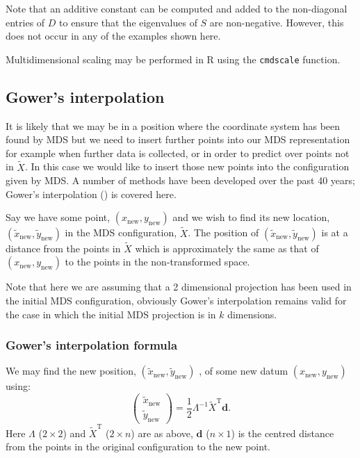 \documentclass[a4paper,10pt]{article}
\newcommand{\tr}[1]{#1^{\text{T}}}
\newcommand{\cross}{\times}
\begin{document}
Note that an additive constant can be computed and added to the non-diagonal entries of $D$ to ensure that the eigenvalues of $S$ are non-negative. However, this does not occur in any of the examples shown here.

Multidimensional scaling may be performed in \textsf{R} using the \texttt{cmdscale} function. 

\subsection{Gower's interpolation} 
\label{gowers}
It is likely that we may be in a position where the coordinate system has been found by MDS but we need to insert further points into our MDS representation for example when further data is collected, or in order to predict over points not in $\tilde{X}$. In this case we would like to insert those new points into the configuration given by MDS. A number of methods have been developed over the past 40 years; Gower's interpolation (\cite{gower1968}) is covered here.

Say we have some point, $(x_{\text{new}},y_{\text{new}})$ and we wish to find its new location, $(\tilde{x}_{\text{new}}, \tilde{y}_{\text{new}})$ in the MDS configuration, $\tilde{X}$. The position of $(\tilde{x}_{\text{new}}, \tilde{y}_{\text{new}})$ is at a distance from the points in $\tilde{X}$ which is approximately the same as that of $(x_{\text{new}},y_{\text{new}})$ to the points in the non-transformed space. 

Note that here we are assuming that a 2 dimensional projection has been used in the initial MDS configuration, obviously Gower's interpolation remains valid for the case in which the initial MDS projection is in $k$ dimensions.

\subsubsection{Gower's interpolation formula}

We may find the new position, $(\tilde{x}_{\text{new}}, \tilde{y}_{\text{new}})$ , of some new datum $(x_{\text{new}},y_{\text{new}})$ using:
\begin{equation}
\begin{pmatrix}
\tilde{x}_{\text{new}}\\
\tilde{y}_{\text{new}}
\end{pmatrix} = \frac{1}{2} \Lambda^{-1} \tr{\tilde{X}} \mathbf{d}.
\label{gower}
\end{equation}
Here $\Lambda$ ($2 \cross 2$) and $\tr{\tilde{X}}$ ($2 \cross n$) are as above, $\mathbf{d}$ ($n \cross 1$) is the centred distance from the points in the original configuration to the new point.
\end{document}
